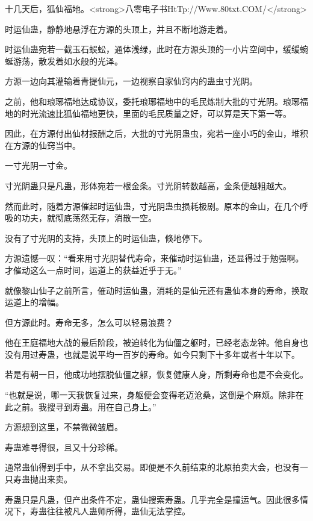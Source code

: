 
\begin{this_body}

十几天后，狐仙福地。<strong>八零电子书HtTp://Www.80txt.COM/</strong>

时运仙蛊，静静地悬浮在方源的头顶上，并且不断地游走着。

时运仙蛊宛若一截玉石蜈蚣，通体浅绿，此时在方源头顶的一小片空间中，缓缓蜿蜒游荡，散发着如水般的光泽。

方源一边向其灌输着青提仙元，一边视察自家仙窍内的蛊虫寸光阴。

之前，他和琅琊福地达成协议，委托琅琊福地中的毛民炼制大批的寸光阴。琅琊福地的时光流速比狐仙福地更快，里面的毛民质量之好，可以算是天下第一等。

因此，在方源付出仙材报酬之后，大批的寸光阴蛊虫，宛若一座小巧的金山，堆积在方源的仙窍当中。

一寸光阴一寸金。

寸光阴蛊只是凡蛊，形体宛若一根金条。寸光阴转数越高，金条便越粗越大。

然而此时，随着方源催起时运仙蛊，寸光阴蛊虫损耗极剧。原本的金山，在几个呼吸的功夫，就彻底荡然无存，消散一空。

没有了寸光阴的支持，头顶上的时运仙蛊，倏地停下。

方源遗憾一叹：“看来用寸光阴替代寿命，来催动时运仙蛊，还显得过于勉强啊。才催动这么一点时间，运道上的获益近乎于无。”

就像黎山仙子之前所言，催动时运仙蛊，消耗的是仙元还有蛊仙本身的寿命，换取运道上的增幅。

但方源此时。寿命无多，怎么可以轻易浪费？

他在王庭福地大战的最后阶段，被迫转化为仙僵之躯时，已经老态龙钟。他自身也没有用过寿蛊，也就是说平均一百岁的寿命。如今只剩下十多年或者十年以下。

若是有朝一日，他成功地摆脱仙僵之躯，恢复健康人身，所剩寿命也是不会变化。

“也就是说，哪一天我恢复过来，身躯便会变得老迈沧桑，这倒是个麻烦。除非在此之前。我搜寻到寿蛊。用在自己身上。”

方源想到这里，不禁微微皱眉。

寿蛊难寻得很，且又十分珍稀。

通常蛊仙得到手中，从不拿出交易。即便是不久前结束的北原拍卖大会，也没有一只寿蛊抛出来卖。

寿蛊只是凡蛊，但产出条件不定，蛊仙搜索寿蛊。几乎完全是撞运气。因此很多情况下，寿蛊往往被凡人蛊师所得，蛊仙无法掌控。


\end{this_body}
